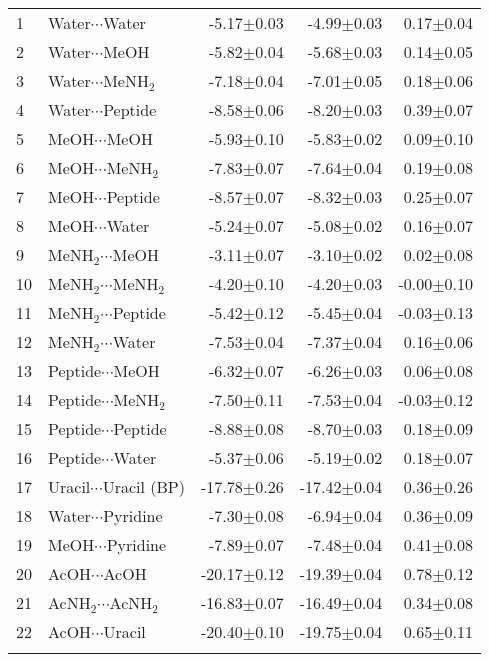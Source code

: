 \begin{longtable}{llrrr}
1 & Water$\cdots$Water & -5.17$\pm$0.03 & -4.99$\pm$0.03 & 0.17$\pm$0.04  \\
2 & Water$\cdots$MeOH & -5.82$\pm$0.04 & -5.68$\pm$0.03 & 0.14$\pm$0.05  \\
3 & Water$\cdots$MeNH$_2$ & -7.18$\pm$0.04 & -7.01$\pm$0.05 & 0.18$\pm$0.06  \\
4 & Water$\cdots$Peptide & -8.58$\pm$0.06 & -8.20$\pm$0.03 & 0.39$\pm$0.07  \\
5 & MeOH$\cdots$MeOH & -5.93$\pm$0.10 & -5.83$\pm$0.02 & 0.09$\pm$0.10  \\
6 & MeOH$\cdots$MeNH$_2$ & -7.83$\pm$0.07 & -7.64$\pm$0.04 & 0.19$\pm$0.08  \\
7 & MeOH$\cdots$Peptide & -8.57$\pm$0.07 & -8.32$\pm$0.03 & 0.25$\pm$0.07  \\
8 & MeOH$\cdots$Water & -5.24$\pm$0.07 & -5.08$\pm$0.02 & 0.16$\pm$0.07  \\
9 & MeNH$_2$$\cdots$MeOH & -3.11$\pm$0.07 & -3.10$\pm$0.02 & 0.02$\pm$0.08  \\
10 & MeNH$_2$$\cdots$MeNH$_2$ & -4.20$\pm$0.10 & -4.20$\pm$0.03 & -0.00$\pm$0.10  \\
11 & MeNH$_2$$\cdots$Peptide & -5.42$\pm$0.12 & -5.45$\pm$0.04 & -0.03$\pm$0.13  \\
12 & MeNH$_2$$\cdots$Water & -7.53$\pm$0.04 & -7.37$\pm$0.04 & 0.16$\pm$0.06  \\
13 & Peptide$\cdots$MeOH & -6.32$\pm$0.07 & -6.26$\pm$0.03 & 0.06$\pm$0.08  \\
14 & Peptide$\cdots$MeNH$_2$ & -7.50$\pm$0.11 & -7.53$\pm$0.04 & -0.03$\pm$0.12  \\
15 & Peptide$\cdots$Peptide & -8.88$\pm$0.08 & -8.70$\pm$0.03 & 0.18$\pm$0.09  \\
16 & Peptide$\cdots$Water & -5.37$\pm$0.06 & -5.19$\pm$0.02 & 0.18$\pm$0.07  \\
17 & Uracil$\cdots$Uracil (BP) & -17.78$\pm$0.26 & -17.42$\pm$0.04 & 0.36$\pm$0.26  \\
18 & Water$\cdots$Pyridine & -7.30$\pm$0.08 & -6.94$\pm$0.04 & 0.36$\pm$0.09  \\
19 & MeOH$\cdots$Pyridine & -7.89$\pm$0.07 & -7.48$\pm$0.04 & 0.41$\pm$0.08  \\
20 & AcOH$\cdots$AcOH & -20.17$\pm$0.12 & -19.39$\pm$0.04 & 0.78$\pm$0.12  \\
21 & AcNH$_2$$\cdots$AcNH$_2$ & -16.83$\pm$0.07 & -16.49$\pm$0.04 & 0.34$\pm$0.08  \\
22 & AcOH$\cdots$Uracil & -20.40$\pm$0.10 & -19.75$\pm$0.04 & 0.65$\pm$0.11  \\
$$
\end{longtable}
